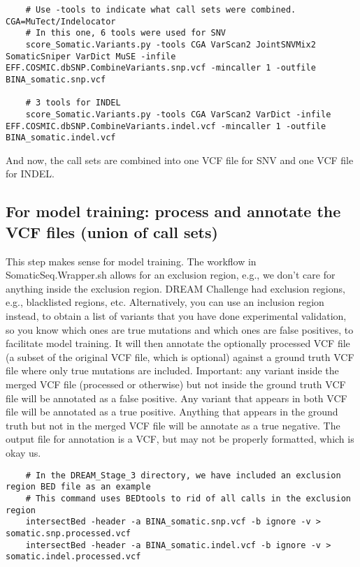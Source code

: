 \documentclass[10pt,letterpaper]{article}
\begin{document}
\begin{sloppypar}
\begin{enumerate}
	\begin{lstlisting}
	# Use -tools to indicate what call sets were combined. CGA=MuTect/Indelocator
	# In this one, 6 tools were used for SNV
	score_Somatic.Variants.py -tools CGA VarScan2 JointSNVMix2 SomaticSniper VarDict MuSE -infile EFF.COSMIC.dbSNP.CombineVariants.snp.vcf -mincaller 1 -outfile BINA_somatic.snp.vcf
	
	# 3 tools for INDEL
	score_Somatic.Variants.py -tools CGA VarScan2 VarDict -infile EFF.COSMIC.dbSNP.CombineVariants.indel.vcf -mincaller 1 -outfile BINA_somatic.indel.vcf
	\end{lstlisting}
	
	And now, the call sets are combined into one VCF file for SNV and one VCF file for INDEL.

	
	\end{enumerate}





	\subsection{For model training: process and annotate the VCF files (union of call sets)}

	This step makes sense for model training. The workflow in SomaticSeq.Wrapper.sh allows for an exclusion region, e.g., we don't care for anything inside the exclusion region. DREAM Challenge had exclusion regions, e.g., blacklisted regions, etc. Alternatively, you can use an inclusion region instead, to obtain a list of variants that you have done experimental validation, so you know which ones are true mutations and which ones are false positives, to facilitate model training. 
	It will then annotate the optionally processed VCF file (a subset of the original VCF file, which is optional) against a ground truth VCF file where only true mutations are included. Important: any variant inside the merged VCF file (processed or otherwise) but not inside the ground truth VCF file will be annotated as a false positive. Any variant that appears in both VCF file will be annotated as a true positive. Anything that appears in the ground truth but not in the merged VCF file will be annotate as a true negative. The output file for annotation is a VCF, but may not be properly formatted, which is okay us. 
	
	\begin{lstlisting}
	# In the DREAM_Stage_3 directory, we have included an exclusion region BED file as an example
	# This command uses BEDtools to rid of all calls in the exclusion region
	intersectBed -header -a BINA_somatic.snp.vcf -b ignore -v > somatic.snp.processed.vcf
	intersectBed -header -a BINA_somatic.indel.vcf -b ignore -v > somatic.indel.processed.vcf
	

\end{lstlisting}
\end{sloppypar}
\end{document}
